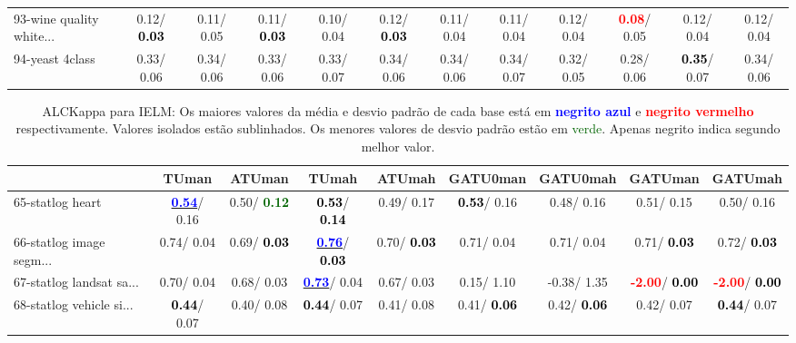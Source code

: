 \begin{table}[h]
\begin{center}
{\begin{tabular}{lc|c|c|c|c|c|c|c|c|c|c}
93-wine quality white... &   0.12/\textcolor{black}{\textbf{  0.03}} &   0.11/  0.05 &   0.11/\textcolor{black}{\textbf{  0.03}} &   0.10/  0.04 &   0.12/\textcolor{black}{\textbf{  0.03}} &   0.11/  0.04 &   0.11/  0.04 &   0.12/  0.04 & \textcolor{red}{\textbf{  0.08}}/  0.05 &   0.12/  0.04 &   0.12/  0.04 \\
94-yeast 4class &   0.33/  0.06 &   0.34/  0.06 &   0.33/  0.06 &   0.33/  0.07 &   0.34/  0.06 &   0.34/  0.06 &   0.34/  0.07 &   0.32/  0.05 &   0.28/  0.06 & \textcolor{black}{\textbf{  0.35}}/  0.07 &   0.34/  0.06 \\\end{tabular}}\label{stratsALCKappa2aIELM}
\end{center}
\end{table}
\begin{table}[h]
\caption{ALCKappa para IELM: Os maiores valores da média e desvio padrão de cada base está em \textcolor{blue}{\textbf{negrito azul}} e \textcolor{red}{\textbf{negrito vermelho}} respectivamente. Valores isolados estão sublinhados. Os menores valores de desvio padrão estão em \textcolor{darkgreen}{verde}. Apenas negrito indica segundo melhor valor.}
\begin{center}\begin{tabular}{lc|c|c|c|c|c|c|c}
 & TUman & \textbf{ATUman} & TUmah & \textbf{ATUmah} & GATU0man & GATU0mah & GATUman & GATUmah\\ \hline 65-statlog heart & \underline{\textcolor{blue}{\textbf{  0.54}}}/  0.16 &   0.50/\textcolor{darkgreen}{\textbf{  0.12}} & \textcolor{black}{\textbf{  0.53}}/\textcolor{black}{\textbf{  0.14}} &   0.49/  0.17 & \textcolor{black}{\textbf{  0.53}}/  0.16 &   0.48/  0.16 &   0.51/  0.15 &   0.50/  0.16 \\
66-statlog image segm... &   0.74/  0.04 &   0.69/\textcolor{black}{\textbf{  0.03}} & \underline{\textcolor{blue}{\textbf{  0.76}}}/\textcolor{black}{\textbf{  0.03}} &   0.70/\textcolor{black}{\textbf{  0.03}} &   0.71/  0.04 &   0.71/  0.04 &   0.71/\textcolor{black}{\textbf{  0.03}} &   0.72/\textcolor{black}{\textbf{  0.03}} \\
67-statlog landsat sa... &   0.70/  0.04 &   0.68/  0.03 & \underline{\textcolor{blue}{\textbf{  0.73}}}/  0.04 &   0.67/  0.03 &   0.15/  1.10 &  -0.38/  1.35 & \textcolor{red}{\textbf{ -2.00}}/\textcolor{black}{\textbf{  0.00}} & \textcolor{red}{\textbf{ -2.00}}/\textcolor{black}{\textbf{  0.00}} \\
68-statlog vehicle si... & \textcolor{black}{\textbf{  0.44}}/  0.07 &   0.40/  0.08 & \textcolor{black}{\textbf{  0.44}}/  0.07 &   0.41/  0.08 &   0.41/\textcolor{black}{\textbf{  0.06}} &   0.42/\textcolor{black}{\textbf{  0.06}} &   0.42/  0.07 & \textcolor{black}{\textbf{  0.44}}/  0.07 \\

\end{tabular}
\end{center}
\end{table}
